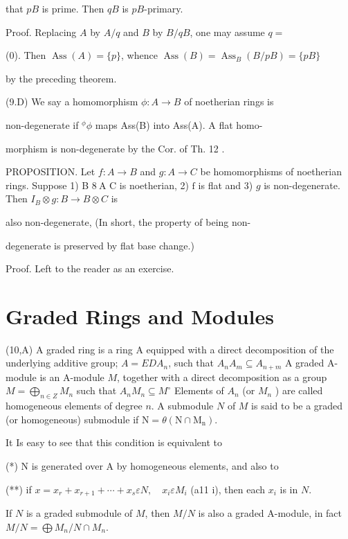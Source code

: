 that $p B$ is prime. Then $q B$ is $p B$-primary.

Proof. Replacing $A$ by $A / q$ and $B$ by $B / q B$, one may assume $q=$

(0). Then $\operatorname{Ass}(A)=\{p\}$, whence $\operatorname{Ass}(B)=\operatorname{Ass}_{B}(B / p B)=\{p B\}$

by the preceding theorem.

(9.D) We say a homomorphism $\phi: A \rightarrow B$ of noetherian rings is

non-degenerate if ${ }^{\phi} \phi$ maps Ass(B) into Ass(A). A flat homo-

morphism is non-degenerate by the Cor. of Th. 12 .

PROPOSITION. Let $f: A \rightarrow B$ and $g: A \rightarrow C$ be homomorphisms of noetherian rings. Suppose 1) B $8 \mathrm{~A}$ C is noetherian, 2) $\mathrm{f}$ is flat and 3) $g$ is non-degenerate. Then $I_{B} \otimes g: B \rightarrow B \otimes C$ is

also non-degenerate, (In short, the property of being non-

degenerate is preserved by flat base change.)

Proof. Left to the reader as an exercise.

\section{Graded Rings and Modules}
(10,A) A graded ring is a ring A equipped with a direct decomposition of the underlying additive group; $A=E D A_{n}$, such that $A_{n} A_{m} \subseteq A_{n+m}$ A graded A-module is an A-module $M$, together with a direct decomposition as a group $M=\bigoplus_{n \in Z} M_{n}$ such that $A_{n} M_{n} \subseteq M^{\circ}$ Elements of $A_{n}$ (or $M_{n}$ ) are called homogeneous elements of degree $n$. A submodule $N$ of $M$ is said to be a graded (or homogeneous) submodule if $\mathrm{N}=\theta\left(\mathrm{N} \cap \mathrm{M}_{\mathrm{n}}\right)$.

It Is easy to see that this condition is equivalent to

(*) $\mathrm{N}$ is generated over A by homogeneous elements, and also to

(**) if $x=x_{r}+x_{r+1}+\cdots+x_{s} \varepsilon N, \quad x_{i} \varepsilon M_{i}$ (a11 i), then each $x_{i}$ is in $N$.

If $N$ is a graded submodule of $M$, then $M / N$ is also a graded A-module, in fact $M / N=\bigoplus M_{n} / N \cap M_{n}$.

